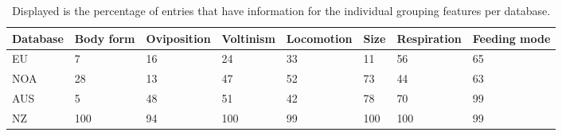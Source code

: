 \documentclass[../Draft_harmonization_paper.tex]{subfiles}
\begin{document}
\begin{table}[ht]
    \centering
    \caption{Displayed is the percentage of entries that have information for the individual grouping features per database.} 
    \label{tab:trait_coverage}
    \begin{tabular}{llllllll}
    \toprule[.1em]
    Database & Body form & Oviposition & Voltinism & Locomotion & Size & Respiration & Feeding mode \\ 
    \toprule[.1em]
    EU & 7 & 16 & 24 & 33 & 11 & 56 & 65 \\ 
    NOA & 28 & 13 & 47 & 52 & 73 & 44 & 63 \\ 
    AUS & 5 & 48 & 51 & 42 & 78 & 70 & 99 \\ 
    NZ & 100 & 94 & 100 & 99 & 100 & 100 & 99 \\ 
    \bottomrule
    \end{tabular}
    \end{table}
\end{document}
